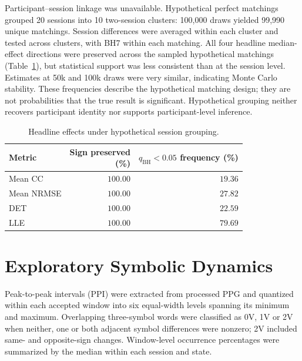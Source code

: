 \documentclass[conference,a4paper]{IEEEtran}
\begin{document}
Participant--session linkage was unavailable. Hypothetical perfect matchings grouped 20 sessions into 10 two-session clusters: 100,000 draws yielded 99,990 unique matchings. Session differences were averaged within each cluster and tested across clusters, with BH7 within each matching. All four headline median-effect directions were preserved across the sampled hypothetical matchings (Table~\ref{tab:supp_dependence}), but statistical support was less consistent than at the session level. Estimates at 50k and 100k draws were very similar, indicating Monte Carlo stability. These frequencies describe the hypothetical matching design; they are not probabilities that the true result is significant. Hypothetical grouping neither recovers participant identity nor supports participant-level inference.

\begin{table}[!htbp]
\centering
\caption{Headline effects under hypothetical session grouping.}
\label{tab:supp_dependence}
\footnotesize
\setlength{\tabcolsep}{4pt}
\renewcommand{\arraystretch}{1.05}

\begin{tabular}{@{}lrr@{}}
\toprule
Metric &
\makecell{Sign preserved\\(\%)} &
\makecell{$q_{\mathrm{BH}}<0.05$\\frequency (\%)}\\
\midrule
Mean CC    & $100.00$ & $19.36$\\
Mean NRMSE & $100.00$ & $27.82$\\
DET        & $100.00$ & $22.59$\\
LLE        & $100.00$ & $79.69$\\
\bottomrule
\end{tabular}
\end{table}


\section{Exploratory Symbolic Dynamics}
\label{sec:supp_8}

Peak-to-peak intervals (PPI) were extracted from processed PPG and quantized within each accepted window into six equal-width levels spanning its minimum and maximum. Overlapping three-symbol words were classified as 0V, 1V or 2V when neither, one or both adjacent symbol differences were nonzero; 2V included same- and opposite-sign changes. Window-level occurrence percentages were summarized by the median within each session and state.
\end{document}
